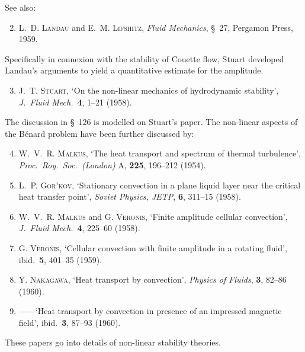 See also:
\begin{enumerate}
\setcounter{enumi}{1}
\item L.~D. \textsc{Landau} and E.~M. \textsc{Lifshitz}, \textit{Fluid Mechanics}, \S~27, Pergamon Press, 1959.
\end{enumerate}

Specifically in connexion with the stability of Couette flow, Stuart developed Landau's arguments to yield a quantitative estimate for the amplitude.
\begin{enumerate}
\setcounter{enumi}{2}
\item J.~T. \textsc{Stuart}, `On the non-linear mechanics of hydrodynamic stability', \textit{J.\ Fluid Mech.}\ \textbf{4}, 1--21 (1958).
\end{enumerate}

The discussion in \S~126 is modelled on Stuart's paper. The non-linear aspects of the B\'enard problem have been further discussed by:
\begin{enumerate}
\setcounter{enumi}{3}
\item W.~V.~R. \textsc{Malkus}, `The heat transport and spectrum of thermal turbulence', \textit{Proc.\ Roy.\ Soc.\ (London)} A, \textbf{225}, 196--212 (1954).
\item L.~P. \textsc{Gor'kov}, `Stationary convection in a plane liquid layer near the critical heat transfer point', \textit{Soviet Physics, JETP}, \textbf{6}, 311--15 (1958).
\item W.~V.~R. \textsc{Malkus} and G. \textsc{Veronis}, `Finite amplitude cellular convection', \textit{J.\ Fluid Mech.}\ \textbf{4}, 225--60 (1958).
\item G. \textsc{Veronis}, `Cellular convection with finite amplitude in a rotating fluid', ibid.\ \textbf{5}, 401--35 (1959).
\item Y. \textsc{Nakagawa}, `Heat transport by convection', \textit{Physics of Fluids}, \textbf{3}, 82--86 (1960).
\item ------\quad `Heat transport by convection in presence of an impressed magnetic field', ibid.\ \textbf{3}, 87--93 (1960).
\end{enumerate}

These papers go into details of non-linear stability theories.
